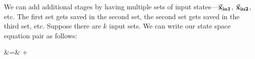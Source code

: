 We can add additional stages by having multiple sets of input states---${\vec{\mathbf{x}}}_{\mathbf{in1}}$, ${\vec{\mathbf{x}}}_{\mathbf{in2}}$, etc. The first set
\clearpage \noindent gets saved in the second set, the second set gets
saved in the third set, etc.  Suppose there are $k$ input sets. We can
write our state space equation pair as follows:

\hspace{-30pt}\begin{minipage}{4in}
\vspace{10pt}
\starteqnstar
{} &\hspace{-6pt}=\hspace{-6pt}&  
+ 
\doneeqnstar
\vspace{24pt}
\end{minipage}
